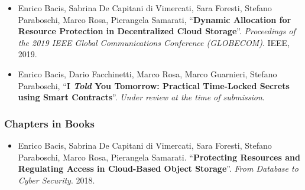 \begin{itemize}
	
	\item Enrico Bacis, Sabrina De Capitani di Vimercati, Sara Foresti, Stefano Paraboschi, Marco Rosa, Pierangela Samarati, ``\textbf{Dynamic Allocation for Resource Protection in Decentralized Cloud Storage}''. {\em Proceedings of the 2019 IEEE Global Communications Conference (GLOBECOM)}. IEEE, 2019.
	
	\item Enrico Bacis, Dario Facchinetti, Marco Rosa, Marco Guarnieri, Stefano Paraboschi, ``\textbf{I {\em Told} You Tomorrow: Practical Time-Locked Secrets using Smart Contracts}''. {\em Under review at the time of submission}.
\end{itemize}

\subsubsection*{Chapters in Books}
\begin{itemize}
	\item  Enrico Bacis,	Sabrina De Capitani di Vimercati, Sara Foresti,	Stefano Paraboschi,	Marco Rosa,	Pierangela Samarati. ``\textbf{Protecting Resources and Regulating Access in Cloud-Based Object Storage}''. {\em From Database to Cyber Security}. 2018.
\end{itemize}
